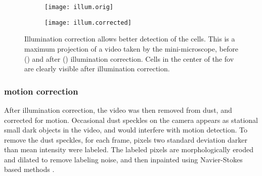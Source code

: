 \begin{figure}[h]
    \begin{subfigure}[t]{.5\textwidth}
        \centering
        \texttt{[image: illum.orig]}
        \caption{\label{illum.orig}}
    \end{subfigure}
    \begin{subfigure}[t]{.5\textwidth}
        \centering
        \texttt{[image: illum.corrected]}
        \caption{\label{illum.corrected}}
    \end{subfigure}
    \caption{Illumination correction allows better detection of the cells. This is a maximum projection of a video taken by the mini-microscope, before () and after () illumination correction. Cells in the center of the \gls{fov} are clearly visible after illumination correction. \label{f.illumination}}
\end{figure}

\subsubsection{motion correction}
After illumination correction, the video was then removed from dust, and corrected for motion. Occasional dust speckles on the camera appears as stational small dark objects in the video, and would interfere with motion detection. To remove the dust speckles, for each frame, pixels two standard deviation darker than mean intensity were labeled. The labeled pixels are morphologically eroded and dilated to remove labeling noise, and then inpainted using Navier-Stokes based methods \citep{bertalmio01}.

